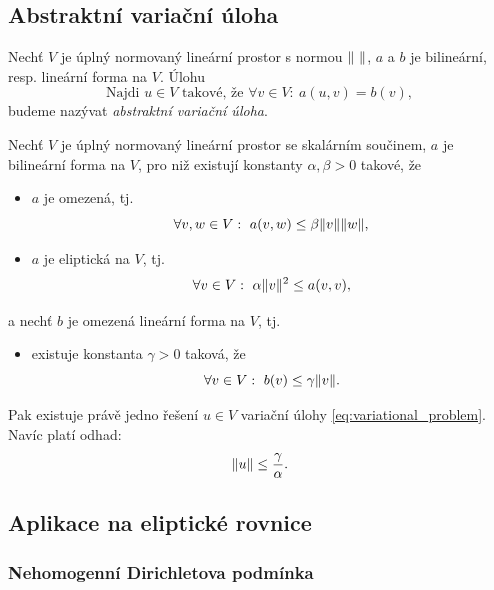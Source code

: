 \subsection{Abstraktní variační úloha}

Nechť $V$ je úplný normovaný lineární prostor s normou $\|\ \|$, $a$ a $b$ je bilineární, resp. lineární forma na $V$.
Úlohu
\begin{equation}
\label{eq:variational_problem}
\text{Najdi }u\in V \text{ takové, že }\forall v\in V:~a(u,v)=b(v),
\end{equation}
budeme nazývat \emph{abstraktní variační úloha}.


\begin{veta}\label{th:lax-milgram}
Nechť $V$ je úplný normovaný lineární prostor se skalárním součinem, $a$ je bilineární forma na $V$, pro niž existují konstanty $\alpha,\beta>0$ takové, že
\begin{itemize}
\item[(i)] $a$ je omezená, tj.
\[ \forall v,w\in V:~a(v,w)\le \beta\|v\|\|w\|, \]
\item[(ii)] $a$ je eliptická na $V$, tj.
\[ \forall v\in V:~\alpha\|v\|^2\le a(v,v), \]
\end{itemize}
a nechť $b$ je omezená lineární forma na $V$, tj.
\begin{itemize}
\item[(iii)] existuje konstanta $\gamma>0$ taková, že 
\[ \forall v\in V:~b(v)\le \gamma\|v\|. \]
\end{itemize}
Pak existuje právě jedno řešení $u\in V$ variační úlohy \eqref{eq:variational_problem}.
Navíc platí odhad:
\[ \|u\| \le \frac\gamma\alpha. \]
\end{veta}


\subsection{Aplikace na eliptické rovnice}


\subsubsection{Nehomogenní Dirichletova podmínka}

